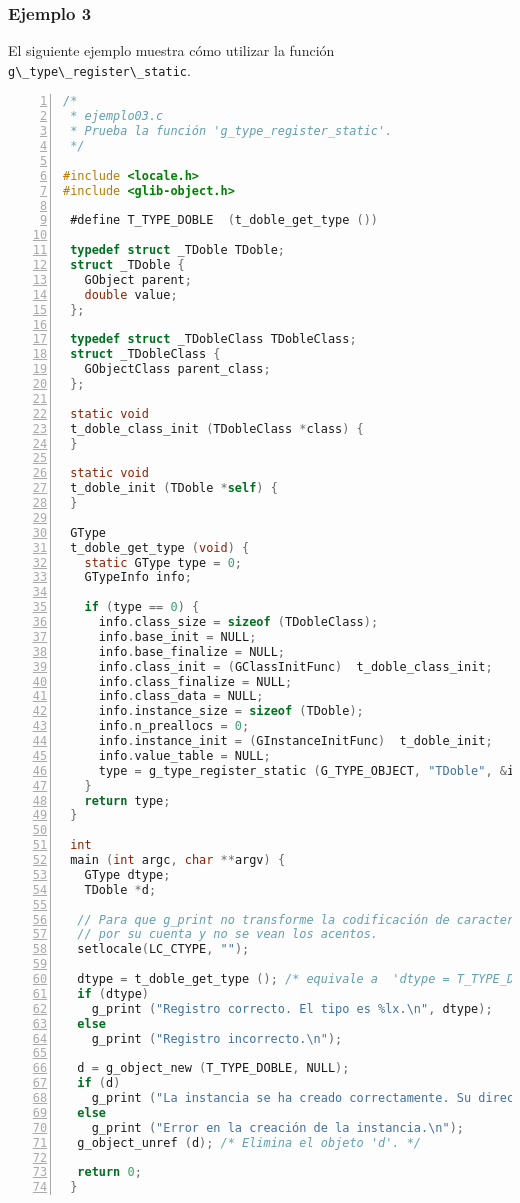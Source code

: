 \subsubsection{Ejemplo 3}
El siguiente ejemplo muestra cómo utilizar la función \passthrough{\lstinline!g\_type\_register\_static!}.

\begin{lstlisting}[language=C, numbers=left]
/*
 * ejemplo03.c
 * Prueba la función 'g_type_register_static'.
 */

#include <locale.h>
#include <glib-object.h>
 
 #define T_TYPE_DOBLE  (t_doble_get_type ())
 
 typedef struct _TDoble TDoble;
 struct _TDoble {
   GObject parent;
   double value;
 };
 
 typedef struct _TDobleClass TDobleClass;
 struct _TDobleClass {
   GObjectClass parent_class;
 };
 
 static void
 t_doble_class_init (TDobleClass *class) {
 }
 
 static void
 t_doble_init (TDoble *self) {
 }
 
 GType
 t_doble_get_type (void) {
   static GType type = 0;
   GTypeInfo info;
 
   if (type == 0) {
     info.class_size = sizeof (TDobleClass);
     info.base_init = NULL;
     info.base_finalize = NULL;
     info.class_init = (GClassInitFunc)  t_doble_class_init;
     info.class_finalize = NULL;
     info.class_data = NULL;
     info.instance_size = sizeof (TDoble);
     info.n_preallocs = 0;
     info.instance_init = (GInstanceInitFunc)  t_doble_init;
     info.value_table = NULL;
     type = g_type_register_static (G_TYPE_OBJECT, "TDoble", &info, 0);
   }
   return type;
 }
 
 int
 main (int argc, char **argv) {
   GType dtype;
   TDoble *d;

  // Para que g_print no transforme la codificación de caracteres
  // por su cuenta y no se vean los acentos.
  setlocale(LC_CTYPE, "");
   
  dtype = t_doble_get_type (); /* equivale a  'dtype = T_TYPE_DOBLE' */
  if (dtype)
    g_print ("Registro correcto. El tipo es %lx.\n", dtype);
  else
    g_print ("Registro incorrecto.\n");
 
  d = g_object_new (T_TYPE_DOBLE, NULL);
  if (d)
    g_print ("La instancia se ha creado correctamente. Su dirección ess %p.\n", d);
  else
    g_print ("Error en la creación de la instancia.\n");
  g_object_unref (d); /* Elimina el objeto 'd'. */
  
  return 0;
 }
 \end{lstlisting}

